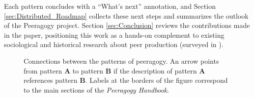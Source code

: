 Each pattern concludes with a ``What's next'' annotation, and Section \ref{sec:Distributed_Roadmap} collects these next steps and summarizes the outlook of the Peeragogy project.  Section \ref{sec:Conclusion} reviews the contributions made in the paper, positioning this work as a hands-on complement to existing sociological and historical research about peer production (surveyed in \cite{benkler2015peer}).

\begin{figure}
\vspace{-.9in}
{\centering


\par
}
\vspace{-.9in}
\caption{Connections between the patterns of peeragogy.  An arrow points from pattern \textbf{A} to pattern \textbf{B} if the description of pattern \textbf{A} references pattern \textbf{B}. Labels at the borders of the figure correspond to the main sections of the \emph{Peeragogy Handbook}.\label{fig:connections}}
\end{figure}

%  

  
  
  
  